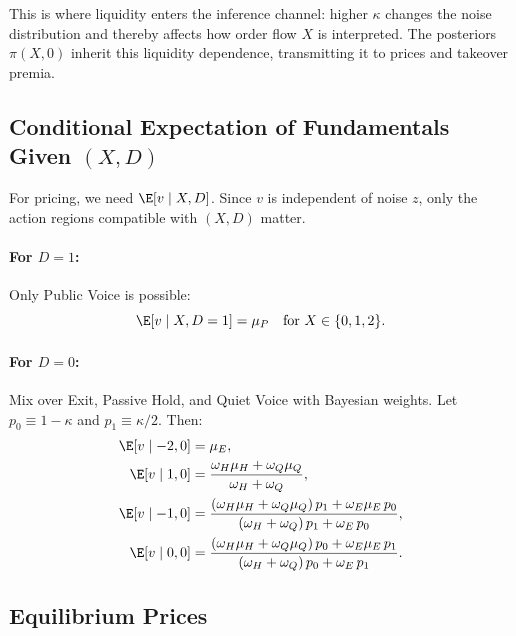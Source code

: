 This is where liquidity enters the inference channel: higher $\kappa$ changes the noise distribution and thereby affects how order flow $X$ is interpreted. The posteriors $\pi(X,0)$ inherit this liquidity dependence, transmitting it to prices and takeover premia.

\subsection{Conditional Expectation of Fundamentals Given \texorpdfstring{$(X,D)$}{(X,D)}}

For pricing, we need $\E[v \mid X, D]$. Since $v$ is independent of noise $z$, only the action regions compatible with $(X, D)$ matter.

\paragraph{For $D=1$:} Only Public Voice is possible:
\[
\E[v \mid X, D=1] = \mu_P \quad \text{for } X \in \{0, 1, 2\}.
\]

\paragraph{For $D=0$:} Mix over Exit, Passive Hold, and Quiet Voice with Bayesian weights. Let $p_0 \equiv 1 - \kappa$ and $p_1 \equiv \kappa/2$. Then:
\begin{align*}
\E[v \mid -2, 0] &= \mu_E, \\
\E[v \mid 1, 0] &= \frac{\omega_H \mu_H + \omega_Q \mu_Q}{\omega_H + \omega_Q}, \\
\E[v \mid -1, 0] &= \frac{(\omega_H \mu_H + \omega_Q \mu_Q) \, p_1 + \omega_E \mu_E \, p_0}{(\omega_H + \omega_Q) \, p_1 + \omega_E \, p_0}, \\
\E[v \mid 0, 0] &= \frac{(\omega_H \mu_H + \omega_Q \mu_Q) \, p_0 + \omega_E \mu_E \, p_1}{(\omega_H + \omega_Q) \, p_0 + \omega_E \, p_1}.
\end{align*}

\subsection{Equilibrium Prices}
\label{sec:prices}

